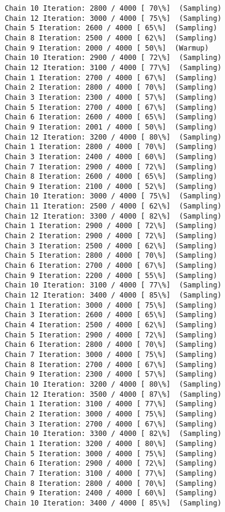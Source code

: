 \documentclass[11pt]{article}
\begin{document}
\begin{Verbatim}[commandchars=\\\{\}]
Chain 10 Iteration: 2800 / 4000 [ 70\%]  (Sampling)
Chain 12 Iteration: 3000 / 4000 [ 75\%]  (Sampling)
Chain 5 Iteration: 2600 / 4000 [ 65\%]  (Sampling)
Chain 8 Iteration: 2500 / 4000 [ 62\%]  (Sampling)
Chain 9 Iteration: 2000 / 4000 [ 50\%]  (Warmup)
Chain 10 Iteration: 2900 / 4000 [ 72\%]  (Sampling)
Chain 12 Iteration: 3100 / 4000 [ 77\%]  (Sampling)
Chain 1 Iteration: 2700 / 4000 [ 67\%]  (Sampling)
Chain 2 Iteration: 2800 / 4000 [ 70\%]  (Sampling)
Chain 3 Iteration: 2300 / 4000 [ 57\%]  (Sampling)
Chain 5 Iteration: 2700 / 4000 [ 67\%]  (Sampling)
Chain 6 Iteration: 2600 / 4000 [ 65\%]  (Sampling)
Chain 9 Iteration: 2001 / 4000 [ 50\%]  (Sampling)
Chain 12 Iteration: 3200 / 4000 [ 80\%]  (Sampling)
Chain 1 Iteration: 2800 / 4000 [ 70\%]  (Sampling)
Chain 3 Iteration: 2400 / 4000 [ 60\%]  (Sampling)
Chain 7 Iteration: 2900 / 4000 [ 72\%]  (Sampling)
Chain 8 Iteration: 2600 / 4000 [ 65\%]  (Sampling)
Chain 9 Iteration: 2100 / 4000 [ 52\%]  (Sampling)
Chain 10 Iteration: 3000 / 4000 [ 75\%]  (Sampling)
Chain 11 Iteration: 2500 / 4000 [ 62\%]  (Sampling)
Chain 12 Iteration: 3300 / 4000 [ 82\%]  (Sampling)
Chain 1 Iteration: 2900 / 4000 [ 72\%]  (Sampling)
Chain 2 Iteration: 2900 / 4000 [ 72\%]  (Sampling)
Chain 3 Iteration: 2500 / 4000 [ 62\%]  (Sampling)
Chain 5 Iteration: 2800 / 4000 [ 70\%]  (Sampling)
Chain 6 Iteration: 2700 / 4000 [ 67\%]  (Sampling)
Chain 9 Iteration: 2200 / 4000 [ 55\%]  (Sampling)
Chain 10 Iteration: 3100 / 4000 [ 77\%]  (Sampling)
Chain 12 Iteration: 3400 / 4000 [ 85\%]  (Sampling)
Chain 1 Iteration: 3000 / 4000 [ 75\%]  (Sampling)
Chain 3 Iteration: 2600 / 4000 [ 65\%]  (Sampling)
Chain 4 Iteration: 2500 / 4000 [ 62\%]  (Sampling)
Chain 5 Iteration: 2900 / 4000 [ 72\%]  (Sampling)
Chain 6 Iteration: 2800 / 4000 [ 70\%]  (Sampling)
Chain 7 Iteration: 3000 / 4000 [ 75\%]  (Sampling)
Chain 8 Iteration: 2700 / 4000 [ 67\%]  (Sampling)
Chain 9 Iteration: 2300 / 4000 [ 57\%]  (Sampling)
Chain 10 Iteration: 3200 / 4000 [ 80\%]  (Sampling)
Chain 12 Iteration: 3500 / 4000 [ 87\%]  (Sampling)
Chain 1 Iteration: 3100 / 4000 [ 77\%]  (Sampling)
Chain 2 Iteration: 3000 / 4000 [ 75\%]  (Sampling)
Chain 3 Iteration: 2700 / 4000 [ 67\%]  (Sampling)
Chain 10 Iteration: 3300 / 4000 [ 82\%]  (Sampling)
Chain 1 Iteration: 3200 / 4000 [ 80\%]  (Sampling)
Chain 5 Iteration: 3000 / 4000 [ 75\%]  (Sampling)
Chain 6 Iteration: 2900 / 4000 [ 72\%]  (Sampling)
Chain 7 Iteration: 3100 / 4000 [ 77\%]  (Sampling)
Chain 8 Iteration: 2800 / 4000 [ 70\%]  (Sampling)
Chain 9 Iteration: 2400 / 4000 [ 60\%]  (Sampling)
Chain 10 Iteration: 3400 / 4000 [ 85\%]  (Sampling)

\end{Verbatim}
\end{document}
